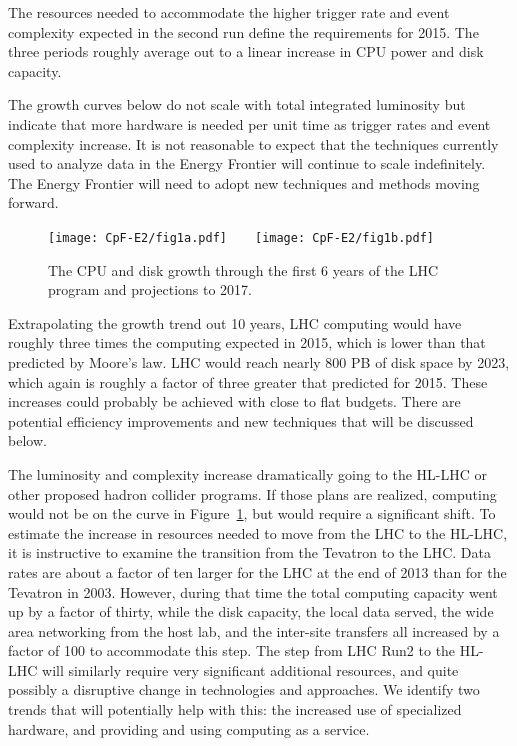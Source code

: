 The resources needed to accommodate
the higher trigger rate and event complexity expected in the second run define
the requirements for
2015.  The three periods roughly average out to a linear increase in
CPU power and disk capacity.

The growth curves below do not scale with total integrated luminosity but
indicate that more hardware is needed per unit time as trigger rates and event
complexity increase. It is not reasonable to expect that the techniques
currently used to analyze data in the Energy Frontier will continue to scale indefinitely.
The Energy Frontier will need to adopt new techniques and methods moving forward.

\begin{figure}[htb]
\begin{center}
\texttt{[image: CpF-E2/fig1a.pdf]}\ \ \ \
\texttt{[image: CpF-E2/fig1b.pdf]}
\caption{The CPU and disk growth through the first 6 years of the LHC program
and projections to 2017.}
\label{fig:growth}
\end{center}
\end{figure}


Extrapolating the growth trend out 10 years,  LHC computing would have
roughly three times the computing expected in 2015, which is lower than that
predicted by Moore's law.  LHC would reach nearly 800 PB of disk 
space by
2023, which again is roughly a factor of three greater that predicted for
2015.   These increases could
probably be achieved with close to flat budgets.   There are potential
efficiency improvements and new techniques that will be discussed below.

The luminosity and complexity increase dramatically
going to the HL-LHC or other proposed hadron collider programs.
If those plans are realized,  computing would not be on
the curve in Figure~\ref{fig:growth}, but would require a significant shift.
To estimate the increase in resources needed to move from the LHC to the
HL-LHC, it is instructive to examine the transition from the Tevatron to the
LHC.  Data rates are about a factor of ten larger for the LHC at the end
of 2013 than for the Tevatron in 2003.
However,  during that time the total computing
capacity went up by a factor of thirty, while the disk capacity, the local data
served, the wide area networking from the host lab, and the inter-site
transfers all increased by a factor of 100 to accommodate this step.  The step
from LHC Run2 to the HL-LHC will similarly require very significant additional
resources, and quite possibly a disruptive change in technologies and
approaches.
We identify two trends that will potentially help with this: the
increased use of specialized hardware, and providing and using computing as a
service.

